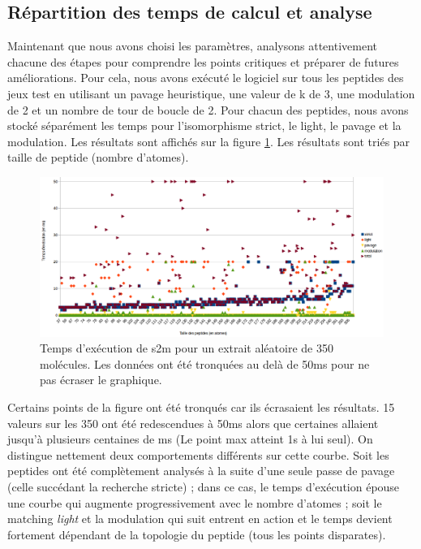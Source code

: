 \subsection{Répartition des temps de calcul et analyse}

Maintenant que nous avons choisi les paramètres, analysons attentivement chacune des étapes pour comprendre les points critiques et préparer de futures améliorations.
Pour cela, nous avons exécuté le logiciel sur tous les peptides des jeux test en utilisant un pavage heuristique, une valeur de k de 3, une modulation de 2 et un nombre de tour de boucle de 2.
Pour chacun des peptides, nous avons stocké séparément les temps pour l'isomorphisme strict, le light, le pavage et la modulation.
Les résultats sont affichés sur la figure \ref{temps_calcul}.
Les résultats sont triés par taille de peptide (nombre d'atomes).

\begin{figure}[!ht]
  \begin{center}
    \includegraphics[width=450px]{Figures/s2m/results/temps_detail.png}
    \caption{\label{temps_calcul}Temps d'exécution de s2m pour un extrait aléatoire de 350 molécules.
    Les données ont été tronquées au delà de 50ms pour ne pas écraser le graphique.}
  \end{center}
\end{figure}

Certains points de la figure ont été tronqués car ils écrasaient les résultats.
15 valeurs sur les 350 ont été redescendues à 50ms alors que certaines allaient jusqu'à plusieurs centaines de ms (Le point max atteint 1s à lui seul).
On distingue nettement deux comportements différents sur cette courbe.
Soit les peptides ont été complètement analysés à la suite d'une seule passe de pavage (celle succédant la recherche stricte) ; dans ce cas, le temps d'exécution épouse une courbe qui augmente progressivement avec le nombre d'atomes ; soit le matching \textit{light} et la modulation qui suit entrent en action et le temps devient fortement dépendant de la topologie du peptide (tous les points disparates).

